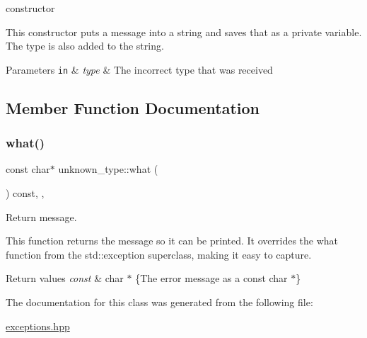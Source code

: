 constructor 

This constructor puts a message into a string and saves that as a private variable. The type is also added to the string.


\begin{DoxyParams}[1]{Parameters}
\mbox{\tt in}  & {\em type} & The incorrect type that was received \\
\hline
\end{DoxyParams}


\subsection{Member Function Documentation}
\mbox{\label{classunknown__type_a95f8c551c7bf001353d4a68b6874650d}} 
\subsubsection{\texorpdfstring{what()}{what()}}
{\footnotesize\ttfamily const char$\ast$ unknown\+\_\+type\+::what (\begin{DoxyParamCaption}{ }\end{DoxyParamCaption}) const\hspace{0.3cm}{\ttfamily [inline]}, {\ttfamily [override]}, {\ttfamily [noexcept]}}



Return message. 

This function returns the message so it can be printed. It overrides the what function from the std\+::exception superclass, making it easy to capture.


\begin{DoxyRetVals}{Return values}
{\em const} & char $\ast$ \{The error message as a const char $\ast$\} \\
\hline
\end{DoxyRetVals}


The documentation for this class was generated from the following file\+:\begin{DoxyCompactItemize}
\item 
\hyperlink{exceptions_8hpp}{exceptions.\+hpp}\end{DoxyCompactItemize}
